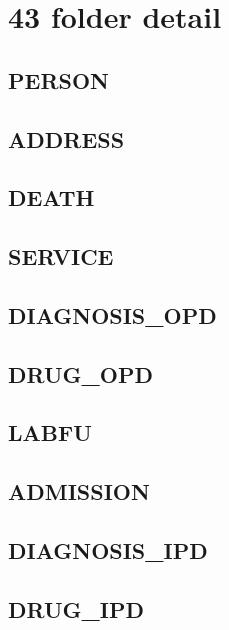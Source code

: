 \chapter{43 folder detail}
    \section{PERSON}
        \label{person_folder}
        
        
    \section{ADDRESS}
        \label{address_folder}
        
        
    \section{DEATH}
        \label{death_folder}
        
        
    \section{SERVICE}
        \label{service_folder}
        
        
    \section{DIAGNOSIS\_OPD}
        \label{diagnosis_opd_folder}
        
        
    \section{DRUG\_OPD}
        \label{drug_opd_folder}
        
        
    \section{LABFU}
        \label{labfu_folder}
        

    \section{ADMISSION}
        \label{admission_folder}
        

    \section{DIAGNOSIS\_IPD}
        \label{diagnosis_ipd_folder}
        
    
    \section{DRUG\_IPD}
        \label{drug_ipd_folder}
        